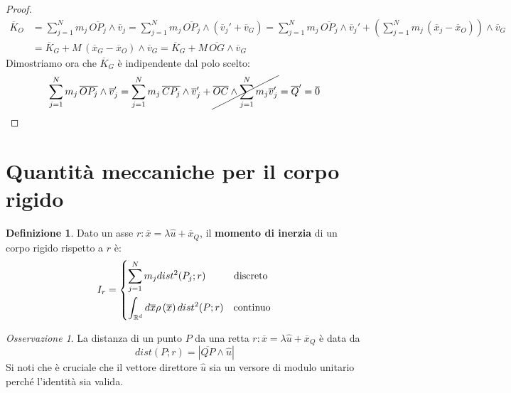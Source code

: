 \documentclass{book}
\theoremstyle{plain}
\theoremstyle{plain}
\theoremstyle{plain}
\theoremstyle{plain}
\theoremstyle{plain}
\theoremstyle{definition}
\newtheorem{defi}{Definizione}[chapter]
\theoremstyle{remark}
\newtheorem*{oss}{Osservazione}
\theoremstyle{definition}
\begin{document}
\begin{proof}
    \[
    \begin{split}
        \overline{K}_O&=\sum_{j=1}^Nm_j\,\overline{OP_j}\wedge\overline{v}_j=\sum_{j=1}^Nm_j\,\overline{OP_j}\wedge(\overline{v}_j'+\overline{v}_G)=\sum_{j=1}^Nm_j\,\overline{OP_j}\wedge\overline{v}_j'+\left(\sum_{j=1}^Nm_j\,(\overline{x}_j-\overline{x}_O)\right)\wedge\overline{v}_G \\
        &=\overline{K}_G+M\,(\overline{x}_G-\overline{x}_O)\wedge\overline{v}_G=\overline{K}_G + M \, \overline{OG} \wedge \overline{v}_G
    \end{split}
    \]
    Dimostriamo ora che $\overline{K}_G$ è indipendente dal polo scelto:
    \begin{displaymath}
        \sum_{j=1}^Nm_j\,\overline{OP_j}\wedge\overline{v}_j'=\sum_{j=1}^Nm_j\,\overline{CP_j}\wedge\overline{v}_j'+\cancel{\overline{OC}\wedge\sum_{j=1}^Nm_j\overline{v}_j'}=\overline{Q}'=\overline{0}
    \end{displaymath}
\end{proof}

\section{Quantità meccaniche per il corpo rigido}

\begin{defi}
    Dato un asse $r: \overline{x} = \lambda \hat{u} + \overline{x}_Q$, il \textbf{momento di inerzia} di un corpo rigido rispetto a $r$ è:
    \begin{displaymath}
        I_r=
        \begin{dcases}
        \sum_{j=1}^N m_j dist^2(P_j; r) \quad \quad \; \; \; \text{discreto} \\
        \int_{\mathbb{R}^d} d\overline{x} \rho \left(\overline{x}\right) dist^2(P; r) \quad \text{continuo}
        \end{dcases}
    \end{displaymath}
\end{defi}

\begin{oss}
    La distanza di un punto $P$ da una retta $r: \overline{x} = \lambda \hat{u} + \overline{x}_Q$ è data da
    \begin{displaymath}
    \boxed{
        dist(P;r) = \left |\overline{QP}\wedge\hat{u} \right|
        }
    \end{displaymath}
    Si noti che è cruciale che il vettore direttore $\hat{u}$ sia un versore di modulo unitario perché l'identità sia valida.
\end{oss}
\end{document}
